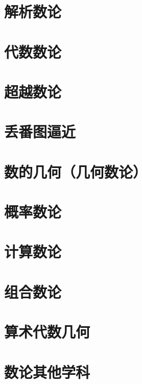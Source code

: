 \documentclass[UTF8]{../09-Mathematics}
\begin{document}
\chapter{解析数论}
\chapter{代数数论}
\chapter{超越数论}
\chapter{丢番图逼近}
\chapter{数的几何（几何数论）}
\chapter{概率数论}
\chapter{计算数论}
\chapter{组合数论}
\chapter{算术代数几何}
\chapter{数论其他学科}
\end{document}
